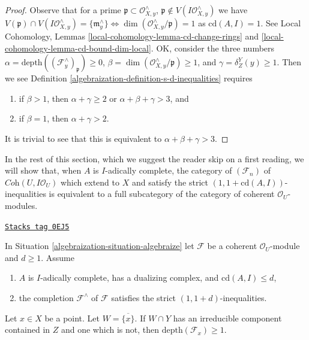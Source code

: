\begin{proof}

Observe that for a prime $\mathfrak p \subset \mathcal{O}_{X, y}^\wedge$,
$\mathfrak p \not \in V(I\mathcal{O}_{X, y}^\wedge)$
we have $V(\mathfrak p) \cap V(I\mathcal{O}_{X, y}^\wedge) =
\{\mathfrak m_y^\wedge\}
\Leftrightarrow \dim(\mathcal{O}_{X, y}^\wedge/\mathfrak p) = 1$
as $\text{cd}(A, I) = 1$.
See Local Cohomology, Lemmas
\ref{local-cohomology-lemma-cd-change-rings} and
\ref{local-cohomology-lemma-cd-bound-dim-local}.
OK, consider the three numbers
$\alpha = \text{depth}((\mathcal{F}^\wedge_y)_\mathfrak p) \geq 0$,
$\beta = \dim(\mathcal{O}_{X, y}^\wedge/\mathfrak p) \geq 1$, and
$\gamma = \delta^Y_Z(y) \geq 1$.
Then we see Definition \ref{algebraization-definition-s-d-inequalities} requires
\begin{enumerate}
\item if $\beta > 1$, then
$\alpha + \gamma \geq 2$ or $\alpha + \beta + \gamma > 3$, and
\item if $\beta = 1$, then $\alpha + \gamma > 2$.
\end{enumerate}
It is trivial to see that this is equivalent to
$\alpha + \beta + \gamma > 3$.
\end{proof}

In the rest of this section, which we suggest the reader skip on a first
reading, we will show that, when $A$ is $I$-adically complete,
the category of $(\mathcal{F}_n)$ of $\textit{Coh}(U, I\mathcal{O}_U)$
which extend to $X$ and satisfy the
strict $(1, 1 + \text{cd}(A, I))$-inequalities
is equivalent to a full subcategory of the category of coherent
$\mathcal{O}_U$-modules.

\begin{lemma}[Sanity]
\label{algebraization-lemma-sanity}
\href{https://stacks.math.columbia.edu/tag/0EJ5}{\texttt{Stacks tag 0EJ5}}

In Situation \ref{algebraization-situation-algebraize} let $\mathcal{F}$ be a
coherent $\mathcal{O}_U$-module and $d \geq 1$. Assume
\begin{enumerate}
\item $A$ is $I$-adically complete, has a dualizing complex, and
$\text{cd}(A, I) \leq d$,
\item the completion $\mathcal{F}^\wedge$ of $\mathcal{F}$
satisfies the strict $(1, 1 + d)$-inequalities.
\end{enumerate}
Let $x \in X$ be a point. Let $W = \overline{\{x\}}$.
If $W \cap Y$ has an irreducible component contained in $Z$
and one which is not, then $\text{depth}(\mathcal{F}_x) \geq 1$.
\end{lemma}

